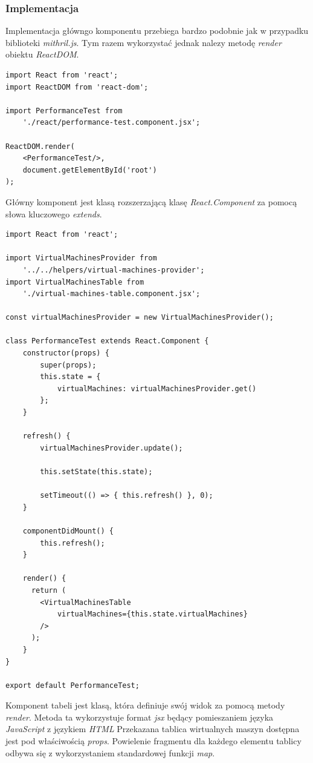 \documentclass[polish, twoside, 12pt]{mwart}
\begin{document}
\subsubsection{Implementacja}

Implementacja główngo komponentu przebiega bardzo podobnie jak w przypadku biblioteki \emph{mithril.js}. Tym razem wykorzystać jednak nalezy metodę \emph{render} obiektu \emph{ReactDOM}.

\begin{lstlisting}[caption=Inicjalizacja głównego komponentu]
import React from 'react';
import ReactDOM from 'react-dom';

import PerformanceTest from
    './react/performance-test.component.jsx';

ReactDOM.render(
    <PerformanceTest/>,
    document.getElementById('root')
);
\end{lstlisting}

Główny komponent jest klasą rozszerzającą klasę \emph{React.Component} za pomocą słowa kluczowego \emph{extends}.

\begin{lstlisting}[caption=Główny komponent]
import React from 'react';

import VirtualMachinesProvider from
    '../../helpers/virtual-machines-provider';
import VirtualMachinesTable from
    './virtual-machines-table.component.jsx';

const virtualMachinesProvider = new VirtualMachinesProvider();

class PerformanceTest extends React.Component {
    constructor(props) {
        super(props);
        this.state = {
            virtualMachines: virtualMachinesProvider.get()
        };
    }

    refresh() {
        virtualMachinesProvider.update();

        this.setState(this.state);

        setTimeout(() => { this.refresh() }, 0);
    }

    componentDidMount() {
        this.refresh();
    }

    render() {
      return (
        <VirtualMachinesTable
            virtualMachines={this.state.virtualMachines}
        />
      );
    }
}

export default PerformanceTest;
\end{lstlisting}

Komponent tabeli jest klasą, która definiuje swój widok za pomocą metody \emph{render}. Metoda ta wykorzystuje format \emph{jsx} będący pomieszaniem języka \emph{JavaScript} z językiem \emph{HTML}
Przekazana tablica wirtualnych maszyn dostępna jest pod właściwością \emph{props}. Powielenie fragmentu dla każdego elementu tablicy odbywa się z wykorzystaniem standardowej funkcji \emph{map}.
\end{document}
